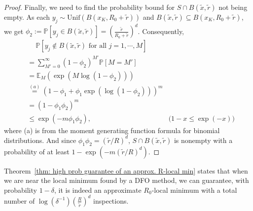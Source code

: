 \documentclass[sn-mathphys,Numbered]{sn-jnl}
\theoremstyle{thmstyleone}
\theoremstyle{thmstyletwo}
\theoremstyle{thmstylethree}
\newcommand{\BK}[1]{{\textcolor{cyan}{#1}}}
\begin{document}
\begin{proof}
    Finally, we need to find the probability bound for $S \cap B(\tilde{x}, \tilde{r})$ not being empty. As each $y_j \sim \mathrm{Unif}(B(x_K, R_0 + \tilde{r}))$ and $B(\tilde{x},\tilde{r}) \subseteq B(x_K, R_0 + \tilde{r})$, we get $\phi_2 := \mathbb{P}[y_j \in B(\tilde{x}, \tilde{r})] = \left(\frac{\tilde{r}}{R_0 + \tilde{r}}\right)^d$. Consequently,
    \begin{align*}
        & \quad~\mathbb{P}[y_j \not\in B(\tilde{x}, \tilde{r}) \text{ for all } j = 1, \cdots, M] \\
        & =\sum_{M' = 0}^{\infty} \left(1 - \phi_2\right)^{M'} \mathbb{P}[M = M'] \\
        & =\mathbb{E}_{M}(\exp{(M\log(1-\phi_2))}) \\
        & \stackrel{(a)}{=} (1-\phi_1 + \phi_1 \exp{(\log(1-\phi_2))})^m \\
        & = (1-\phi_1 \phi_2 )^m \\
        & \leq \exp(-m\phi_1 \phi_2), & \text{($1-x \leq \exp(-x)$)}
    \end{align*}
    where (a) is from the moment generating function formula for binomial distributions.
    And since $\phi_1 \phi_2 = (\tilde{r}/R)^d$, $S \cap B(\tilde{x}, \tilde{r})$ is nonempty with a probability of at least $1 - \exp(-m (\tilde{r}/R)^d)$.
\end{proof}



Theorem~\ref{thm: high prob guarantee of an approx. R-local min} states that when we are near the local minimum found by a DFO method, we can guarantee, with probability $1-\delta$, it is indeed an approximate $R_0$-local minimum with a total number of $\log(\delta^{-1}) \left(\frac{R}{\tilde{r}}\right)^d$ inspections.

\end{document}

